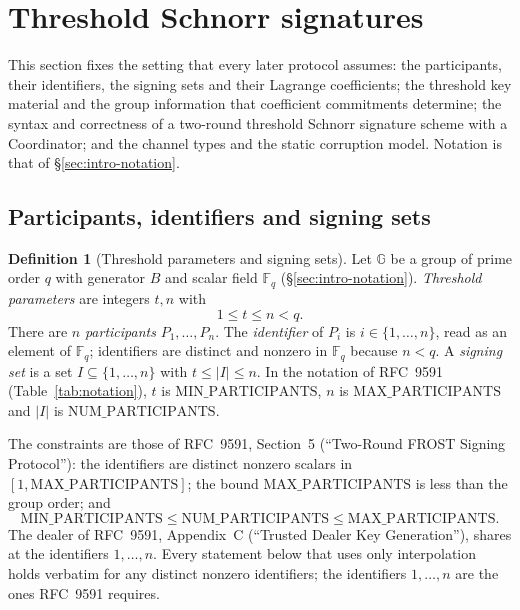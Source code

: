 \documentclass[11pt,a4paper]{article}
\theoremstyle{definition}
\newtheorem{definition}[theorem]{Definition}
\newcommand{\F}{\mathbb{F}}
\newcommand{\G}{\mathbb{G}}
\newcommand{\Fq}{\F_q}
\begin{document}
\section{Threshold Schnorr signatures}\label{sec:ts}

This section fixes the setting that every later protocol assumes: the
participants, their identifiers, the signing sets and their Lagrange
coefficients; the threshold key material and the group information that
coefficient commitments determine; the syntax and correctness of a two-round
threshold Schnorr signature scheme with a Coordinator; and the channel types
and the static corruption model. Notation is that of
\S\ref{sec:intro-notation}.

\subsection{Participants, identifiers and signing sets}\label{sec:ts-ids}

\begin{definition}[Threshold parameters and signing sets]
\label{def:ts-params}
Let \(\G\) be a group of prime order \(q\) with generator \(B\) and scalar
field \(\Fq\) (\S\ref{sec:intro-notation}). \emph{Threshold parameters} are
integers \(t, n\) with
\[
  1 \le t \le n < q .
\]
There are \(n\) \emph{participants} \(P_1, \dots, P_n\). The
\emph{identifier} of \(P_i\) is \(i \in \{1, \dots, n\}\), read as an element
of \(\Fq\); identifiers are distinct and nonzero in \(\Fq\) because
\(n < q\). A \emph{signing set} is a set \(I \subseteq \{1, \dots, n\}\) with
\(t \le \lvert I \rvert \le n\). In the notation of RFC~9591
(Table~\ref{tab:notation}), \(t\) is \(\mathrm{MIN\_PARTICIPANTS}\), \(n\) is
\(\mathrm{MAX\_PARTICIPANTS}\) and \(\lvert I \rvert\) is
\(\mathrm{NUM\_PARTICIPANTS}\).
\end{definition}

The constraints are those of RFC~9591, Section~5 (``Two-Round FROST Signing
Protocol''): the identifiers are distinct nonzero scalars in
\([1, \mathrm{MAX\_PARTICIPANTS}]\); the bound \(\mathrm{MAX\_PARTICIPANTS}\)
is less than the group order; and
\[
  \mathrm{MIN\_PARTICIPANTS} \le \mathrm{NUM\_PARTICIPANTS} \le
  \mathrm{MAX\_PARTICIPANTS} .
\]
The dealer of RFC~9591, Appendix~C (``Trusted
Dealer Key Generation''), shares at the identifiers \(1, \dots, n\). Every
statement below that uses only interpolation holds verbatim for any distinct
nonzero identifiers; the identifiers \(1, \dots, n\) are the ones RFC~9591
requires.
\end{document}

